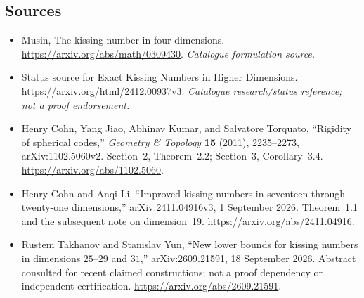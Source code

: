 \documentclass[11pt,a4paper]{article}
\numberwithin{equation}{section}
\begin{document}
\subsection{Sources}
\begin{itemize}\raggedright
\item[\textnormal{[S1]}]\hypertarget{source:statement:1}{} Musin, The kissing number in four dimensions.
\url{https://arxiv.org/abs/math/0309430}.
{\small\textit{Catalogue formulation source.}}
\item[\textnormal{[S2]}]\hypertarget{source:statement:2}{} Status source for Exact Kissing Numbers in Higher Dimensions.
\url{https://arxiv.org/html/2412.00937v3}.
{\small\textit{Catalogue research/status reference; not a proof endorsement.}}
\item[\textnormal{[E1]}]\hypertarget{extra:statement:1}{}
Henry Cohn, Yang Jiao, Abhinav Kumar, and Salvatore Torquato,
``Rigidity of spherical codes,'' \emph{Geometry \& Topology}
\textbf{15} (2011), 2235--2273, arXiv:1102.5060v2.
Section~2, Theorem~2.2; Section~3, Corollary~3.4.
\url{https://arxiv.org/abs/1102.5060}.
\item[\textnormal{[E2]}]\hypertarget{extra:statement:2}{}
Henry Cohn and Anqi Li, ``Improved kissing numbers in seventeen through
twenty-one dimensions,'' arXiv:2411.04916v3, 1 September 2026.
Theorem~1.1 and the subsequent note on dimension~19.
\url{https://arxiv.org/abs/2411.04916}.
\item[\textnormal{[E3]}]\hypertarget{extra:statement:3}{}
Rustem Takhanov and Stanislav Yun, ``New lower bounds for kissing numbers
in dimensions $25$--$29$ and $31$,'' arXiv:2609.21591,
18 September 2026. Abstract consulted for recent claimed constructions;
not a proof dependency or independent certification.
\url{https://arxiv.org/abs/2609.21591}.
\end{itemize}
\end{document}
